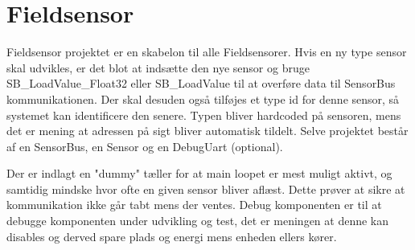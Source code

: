 \section{Fieldsensor}

Fieldsensor projektet er en skabelon til alle 
Fieldsensorer. Hvis en ny type sensor skal 
udvikles, er det blot at indsætte den nye sensor 
og bruge SB\_LoadValue\_Float32 eller SB\_LoadValue 
til at overføre data til SensorBus kommunikationen. 
Der skal desuden også tilføjes et type id for denne 
sensor, så systemet kan identificere den senere. Typen 
bliver hardcoded på sensoren, mens det er mening at 
adressen på sigt bliver automatisk tildelt.
Selve projektet består af en SensorBus, en Sensor 
og en DebugUart (optional).


Der er indlagt en "dummy" tæller for at main loopet er 
mest muligt aktivt, og samtidig mindske hvor ofte en 
given sensor bliver aflæst. Dette prøver at sikre 
at kommunikation ikke går tabt mens der ventes. 
Debug komponenten er til at debugge komponenten under 
udvikling og test, det er meningen at denne kan disables 
og derved spare plads og energi mens enheden ellers kører.